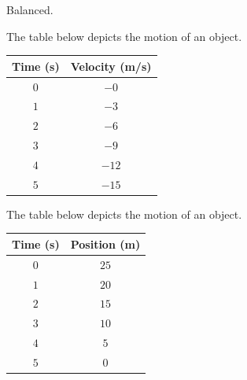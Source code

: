 \documentclass[]{exam}
\begin{document}
\begin{questions}
\begin{parts}
\begin{solution}
    Balanced.
\end{solution}
\end{parts}

\question
The table below depicts the motion of an object.

\begin{center}
    \begin{tabular}{|c|c|}
        \hline
        \textbf{Time} (s) & \textbf{Velocity} (m/s) \\ \hline
        $0$ & $-0$ \\ \hline 
        $1$ & $-3$ \\ \hline
        $2$ & $-6$ \\ \hline
        $3$ & $-9$ \\ \hline
        $4$ & $-12$ \\ \hline
        $5$ & $-15$ \\ \hline
    \end{tabular}
\end{center}


\question
The table below depicts the motion of an object.

\begin{center}
    \begin{tabular}{|c|c|}
        \hline
        \textbf{Time} (s) & \textbf{Position} (m) \\ \hline
        $0$ & $25$ \\ \hline 
        $1$ & $20$ \\ \hline
        $2$ & $15$ \\ \hline
        $3$ & $10$ \\ \hline
        $4$ & $5$ \\ \hline
        $5$ & $0$ \\ \hline
    \end{tabular}
\end{center}


\end{questions}
\end{document}
